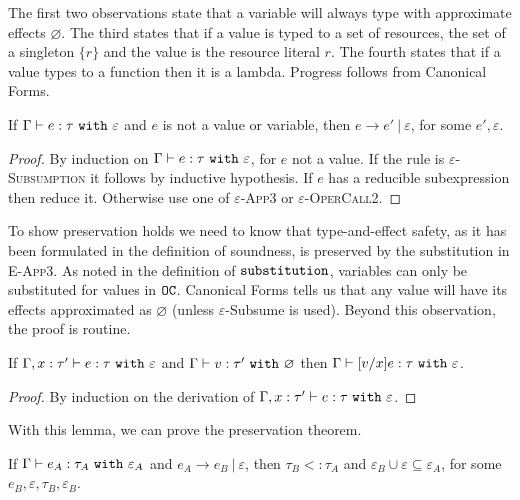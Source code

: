 The first two observations state that a variable will always type with approximate effects $\varnothing$. The third states that if a value is typed to a set of resources, the set of a singleton $\{ r \}$ and the value is the resource literal $r$. The fourth states that if a value types to a function then it is a lambda. Progress follows from Canonical Forms.

\begin{theorem}
If $ \Gamma \vdash  e:  \tau~\mathtt{with}~ \varepsilon$ and $ e$ is not a value or variable, then $ e \longrightarrow  e'~|~\varepsilon$, for some $e', \varepsilon$.
\end{theorem}

\begin{proof} By induction on $ \Gamma \vdash  e:  \tau~\mathtt{with}~ \varepsilon$, for $ e$ not a value. If the rule is \textsc{$\varepsilon$-Subsumption} it follows by inductive hypothesis. If $e$ has a reducible subexpression then reduce it. Otherwise use one of \textsc{$\varepsilon$-App3} or \textsc{$\varepsilon$-OperCall2}.
\end{proof}

To show preservation holds we need to know that type-and-effect safety, as it has been formulated in the definition of soundness, is preserved by the substitution in \textsc{E-App3}. As noted in the definition of $\mathtt{substitution}$, variables can only be substituted for values in $\mathtt{OC}$. Canonical Forms tells us that any value will have its effects approximated as $\varnothing$ (unless $\varepsilon$-Subsume is used). Beyond this observation, the proof is routine.

\begin{lemma}
If $\Gamma, x: \tau' \vdash e: \tau~\mathtt{with}~ \varepsilon$ and $\Gamma \vdash v: \tau'~\mathtt{with}~ \varnothing$ then $\Gamma \vdash [v/x]e: \tau~\mathtt{with}~ \varepsilon$.
\end{lemma}

\begin{proof} By induction on the derivation of $\Gamma, x: \tau' \vdash e: \tau~\mathtt{with}~ \varepsilon$.
\end{proof}

With this lemma, we can prove the preservation theorem.

\begin{theorem}
If $\Gamma \vdash e_A: \tau_A~\mathtt{with}~ \varepsilon_A$ and $e_A \longrightarrow e_B~|~\varepsilon$, then $\tau_B <: \tau_A$ and $\varepsilon_B \cup \varepsilon \subseteq \varepsilon_A$, for some $e_B, \varepsilon, \tau_B, \varepsilon_B$.
\end{theorem}


